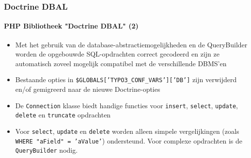 \begin{frame}[fragile]
	\frametitle{Doctrine DBAL}
	\framesubtitle{PHP Bibliotheek "Doctrine DBAL" (2)}

	\begin{itemize}

		\item Met het gebruik van de database-abstractiemogelijkheden en de QueryBuilder
		 	worden de opgebouwde SQL-opdrachten correct gecodeerd en zijn ze automatisch
		 	zoveel mogelijk compatibel met de verschillende DBMS'en

		\item Bestaande opties in \texttt{\$GLOBALS['TYPO3\_CONF\_VARS']['DB']} zijn
			verwijderd en/of gemigreerd naar de nieuwe Doctrine-opties

		\item De \texttt{Connection} klasse biedt handige functies voor
			\texttt{insert}, \texttt{select}, \texttt{update}, \texttt{delete} en
			\texttt{truncate} opdrachten

		\item Voor \texttt{select}, \texttt{update} en \texttt{delete} worden alleen simpele
			vergelijkingen (zoals \texttt{WHERE "aField" = 'aValue'}) ondersteund.
			Voor complexe opdrachten is de \texttt{QueryBuilder} nodig.

	\end{itemize}

\end{frame}

